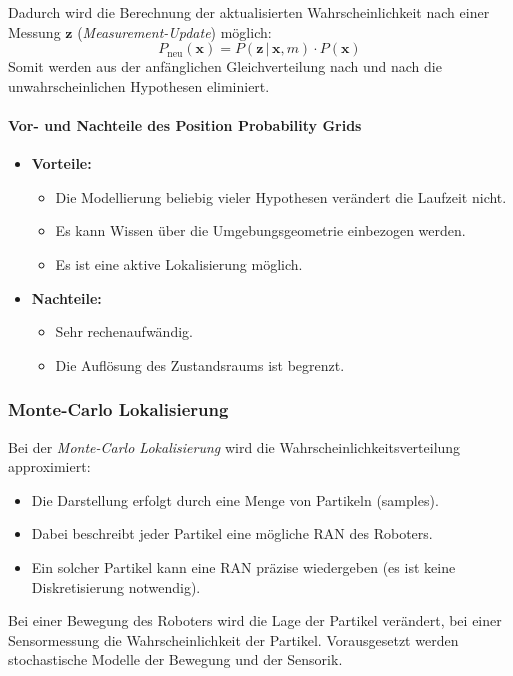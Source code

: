 \documentclass[a4paper, 11pt, accentcolor = tud3b]{tudreport}
\newcommand{\given}{\,\vert\,}
\renewcommand{\vec}[1]{\boldsymbol{\mathbf{#1}}}
\begin{document}
						Dadurch wird die Berechnung der aktualisierten Wahrscheinlichkeit nach einer Messung \( \vec{z} \) (\emph{Measurement-Update}) möglich:
						\begin{equation*}
							P_\text{neu}(\vec{x}) = P(\vec{z} \given \vec{x}, m) \cdot P(\vec{x})
						\end{equation*}
						Somit werden aus der anfänglichen Gleichverteilung nach und nach die unwahrscheinlichen Hypothesen eliminiert.
					
					\paragraph{Vor- und Nachteile des Position Probability Grids}
						\begin{itemize}
							\item \textbf{Vorteile:}
								\begin{itemize}
									\item Die Modellierung beliebig vieler Hypothesen verändert die Laufzeit nicht.
									\item Es kann Wissen über die Umgebungsgeometrie einbezogen werden.
									\item Es ist eine aktive Lokalisierung möglich.
								\end{itemize}
							\item \textbf{Nachteile:}
								\begin{itemize}
									\item Sehr rechenaufwändig.
									\item Die Auflösung des Zustandsraums ist begrenzt.
								\end{itemize}
						\end{itemize}

				\subsubsection{Monte-Carlo Lokalisierung}
					Bei der \emph{Monte-Carlo Lokalisierung} wird die Wahrscheinlichkeitsverteilung approximiert:
					\begin{itemize}
						\item Die Darstellung erfolgt durch eine Menge von Partikeln (samples).
						\item Dabei beschreibt jeder Partikel eine mögliche RAN des Roboters.
						\item Ein solcher Partikel kann eine RAN präzise wiedergeben (es ist keine Diskretisierung notwendig).
					\end{itemize}
					Bei einer Bewegung des Roboters wird die Lage der Partikel verändert, bei einer Sensormessung die Wahrscheinlichkeit der Partikel. Vorausgesetzt werden stochastische Modelle der Bewegung und der Sensorik.
					
\end{document}
